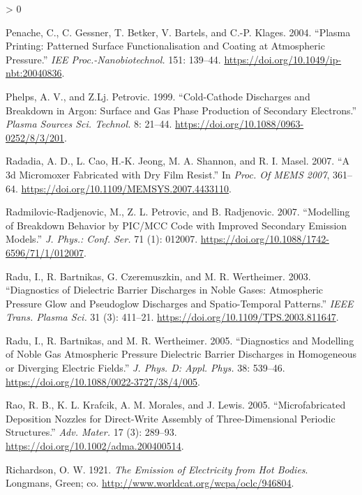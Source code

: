\documentclass[
  10pt,
  twoside]{article}
\newlength{\cslhangindent}
\newenvironment{CSLReferences}[2] %
 {%
  \setlength{\parindent}{0pt}
  \ifodd #1 \everypar{\setlength{\hangindent}{\cslhangindent}}\ignorespaces\fi
  \ifnum #2 > 0
  \setlength{\parskip}{#2\baselineskip}
  \fi
 }%
 {}
\begin{document}
\begin{CSLReferences}{1}{0}
\leavevmode\hypertarget{ref-Pena04}{}%
Penache, C., C. Gessner, T. Betker, V. Bartels, and C.-P. Klages. 2004. {``Plasma Printing: Patterned Surface Functionalisation and Coating at Atmospheric Pressure.''} \emph{IEE Proc.-Nanobiotechnol.} 151: 139--44. \url{https://doi.org/10.1049/ip-nbt:20040836}.

\leavevmode\hypertarget{ref-Phel1999}{}%
Phelps, A. V., and Z.Lj. Petrovic. 1999. {``Cold-Cathode Discharges and Breakdown in Argon: Surface and Gas Phase Production of Secondary Electrons.''} \emph{Plasma Sources Sci. Technol.} 8: 21--44. \url{https://doi.org/10.1088/0963-0252/8/3/201}.

\leavevmode\hypertarget{ref-Rada07}{}%
Radadia, A. D., L. Cao, H.-K. Jeong, M. A. Shannon, and R. I. Masel. 2007. {``A {3d} Micromoxer Fabricated with Dry Film Resist.''} In \emph{Proc. Of MEMS 2007}, 361--64. \url{https://doi.org/10.1109/MEMSYS.2007.4433110}.

\leavevmode\hypertarget{ref-Radm07}{}%
Radmilovic-Radjenovic, M., Z. L. Petrovic, and B. Radjenovic. 2007. {``Modelling of Breakdown Behavior by {PIC/MCC} Code with Improved Secondary Emission Models.''} \emph{J. Phys.: Conf. Ser.} 71 (1): 012007. \url{https://doi.org/10.1088/1742-6596/71/1/012007}.

\leavevmode\hypertarget{ref-Radu03}{}%
Radu, I., R. Bartnikas, G. Czeremuszkin, and M. R. Wertheimer. 2003. {``Diagnostics of Dielectric Barrier Discharges in Noble Gases: Atmospheric Pressure Glow and Pseudoglow Discharges and Spatio-Temporal Patterns.''} \emph{IEEE Trans. Plasma Sci.} 31 (3): 411--21. \url{https://doi.org/10.1109/TPS.2003.811647}.

\leavevmode\hypertarget{ref-Radu05}{}%
Radu, I., R. Bartnikas, and M. R. Wertheimer. 2005. {``Diagnostics and Modelling of Noble Gas Atmospheric Pressure Dielectric Barrier Discharges in Homogeneous or Diverging Electric Fields.''} \emph{J. Phys. D: Appl. Phys.} 38: 539--46. \url{https://doi.org/10.1088/0022-3727/38/4/005}.

\leavevmode\hypertarget{ref-Rao05}{}%
Rao, R. B., K. L. Krafcik, A. M. Morales, and J. Lewis. 2005. {``Microfabricated Deposition Nozzles for Direct-Write Assembly of Three-Dimensional Periodic Structures.''} \emph{Adv. Mater.} 17 (3): 289--93. \url{https://doi.org/10.1002/adma.200400514}.

\leavevmode\hypertarget{ref-Rich1921}{}%
Richardson, O. W. 1921. \emph{The Emission of Electricity from Hot Bodies}. Longmans, Green; co. \url{http://www.worldcat.org/wcpa/oclc/946804}.


\end{CSLReferences}
\end{document}
